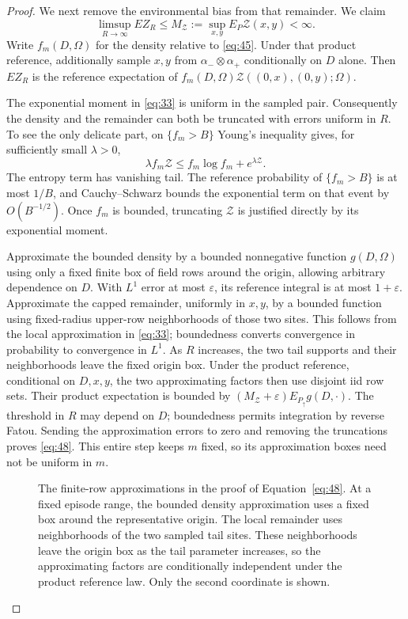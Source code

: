 \begin{proof}
We next remove the environmental bias from that remainder. We claim
\begin{equation*}\tag{48}\label{eq:48}
 \limsup_{R\to\infty}E Z_R
 \le M_\mathcal Z:=\sup_{x,y}E_P\mathcal Z(x,y)<\infty.
\end{equation*}
Write $f_m(D,\Omega)$ for the density relative to
\eqref{eq:45}. Under that product reference, additionally
sample $x,y$ from $\alpha_-\otimes\alpha_+$ conditionally on $D$ alone.
Then $EZ_R$ is the reference expectation of
$f_m(D,\Omega)\mathcal Z((0,x),(0,y);\Omega)$.

The exponential moment in \eqref{eq:33} is uniform in the sampled pair.
Consequently the density and the remainder can both be truncated with
errors uniform in $R$. To see the only delicate part, on $\{f_m>B\}$
Young's inequality gives, for sufficiently small $\lambda>0$,
\[
 \lambda f_m\mathcal Z\le f_m\log f_m+e^{\lambda\mathcal Z}.
\]
The entropy term has vanishing tail. The reference probability of
$\{f_m>B\}$ is at most $1/B$, and Cauchy--Schwarz bounds the exponential
term on that event by $O(B^{-1/2})$. Once $f_m$ is bounded, truncating
$\mathcal Z$ is justified directly by its exponential moment.

Approximate the bounded density by a bounded nonnegative function
$g(D,\Omega)$ using only a fixed finite box of field rows around the
origin, allowing arbitrary dependence on $D$. With $L^1$ error at most
$\varepsilon$, its reference integral is at most $1+\varepsilon$.
Approximate the capped remainder, uniformly in $x,y$, by a bounded
function using fixed-radius
upper-row neighborhoods of those two sites. This follows from the
local approximation in \eqref{eq:33}; boundedness converts convergence
in probability to convergence in $L^1$. As $R$ increases, the two tail
supports and their neighborhoods leave the fixed origin box. Under the
product reference, conditional on $D,x,y$, the two approximating
factors then use disjoint iid row sets. Their product expectation is
bounded by $(M_\mathcal Z+\varepsilon)E_{P_\uparrow}g(D,\cdot)$.
The threshold in $R$ may depend on $D$; boundedness permits integration
by reverse Fatou. Sending the approximation errors to zero and removing
the truncations proves \eqref{eq:48}. This entire step
keeps $m$ fixed, so its approximation boxes need not be uniform in $m$.

\begin{figure}[tbp]
\centering

\caption{The finite-row approximations in the proof of
Equation~\eqref{eq:48}. At a fixed episode range, the
bounded density approximation uses a fixed box around the representative
origin. The local remainder uses neighborhoods of the two sampled tail
sites. These neighborhoods leave the origin box as the tail parameter
increases, so the approximating factors are conditionally independent
under the product reference law. Only the second coordinate is shown.}
\label{fig:tail-decorrelation}
\end{figure}


\end{proof}
